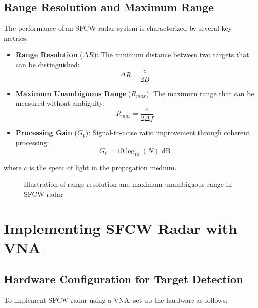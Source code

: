 \documentclass[12pt,a4paper]{article}
\begin{document}
\subsection{Range Resolution and Maximum Range}

The performance of an SFCW radar system is characterized by several key metrics:

\begin{itemize}
    \item \textbf{Range Resolution} ($\Delta R$): The minimum distance between two targets that can be distinguished:
    \begin{equation}
        \Delta R = \frac{c}{2B}
    \end{equation}
    
    \item \textbf{Maximum Unambiguous Range} ($R_{max}$): The maximum range that can be measured without ambiguity:
    \begin{equation}
        R_{max} = \frac{c}{2\Delta f}
    \end{equation}
    
    \item \textbf{Processing Gain} ($G_p$): Signal-to-noise ratio improvement through coherent processing:
    \begin{equation}
        G_p = 10\log_{10}(N) \text{ dB}
    \end{equation}
\end{itemize}

where $c$ is the speed of light in the propagation medium.

\begin{figure}[H]
    \centering
    \caption{Illustration of range resolution and maximum unambiguous range in SFCW radar}
    \label{fig:range_metrics}
\end{figure}

\section{Implementing SFCW Radar with VNA}

\subsection{Hardware Configuration for Target Detection}

To implement SFCW radar using a VNA, set up the hardware as follows:
\end{document}
